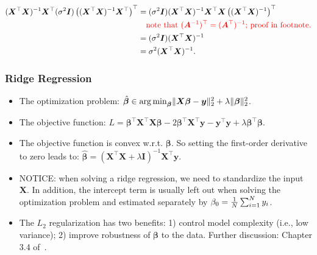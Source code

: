             \begin{equation}
                \begin{aligned}
                     (\bm{X}^\top \bm{X})^{-1} \bm{X}^\top (\sigma^2 \bm{I}) \left( (\bm{X}^\top \bm{X})^{-1} \bm{X}^\top \right)^\top & = (\sigma^2 \bm{I}) (\bm{X}^\top \bm{X})^{-1} \bm{X}^\top  \bm{X}  \left((\bm{X}^\top \bm{X})^{-1}\right)^\top \\
                     & \quad \textcolor{red}{\text{note that $(\bm{A}^{-1})^\top = (\bm{A}^\top)^{-1}$; proof in footnote.}}\\
                     & = (\sigma^2 \bm{I}) (\bm{X}^\top \bm{X})^{-1} \\
                     & = \sigma^2 (\bm{X}^\top \bm{X})^{-1}.
                \end{aligned}
            \end{equation}

         
            
    \subsubsection{Ridge Regression}
        \begin{itemize}
            \item The optimization problem: $\hat{\bm{\beta}} \in \operatorname{arg\,min}_{\bm{\beta}} \lVert\bm{X} \bm{\beta} - \bm{y}\rVert_2^2 + \lambda\lVert\bm{\beta}\rVert_2^2$.
            \item The objective function: $L = \bm{\beta}^\top \bm{X}^\top \bm{X} \bm{\beta} - 2 \bm{\beta}^\top \bm{X}^\top \bm{y} - \bm{y}^\top \bm{y} + \lambda \bm{\beta}^\top \bm{\beta}$.
            \item The objective function is convex w.r.t. $\bm{\beta}$. So setting the first-order derivative to zero leads to: $\hat{\bm{\beta}} = (\bm{X}^\top \bm{X} + \lambda \bm{I})^{-1} \bm{X}^\top \bm{y}$.
            \item NOTICE: when solving a ridge regression, we need to standardize the input $\bm{X}$. In addition, the intercept term is usually left out when solving the optimization problem and estimated separately by $\beta_0 = \frac{1}{N}\sum_{i=1}^{N}{y_i}$.
            \item The $L_2$ regularization has two benefits: 1) control model complexity (i.e., low variance); 2) improve robustness of $\bm{\beta}$ to the data. Further discussion: Chapter 3.4 of~\cite{hastie2009elements}.
        \end{itemize}
        
